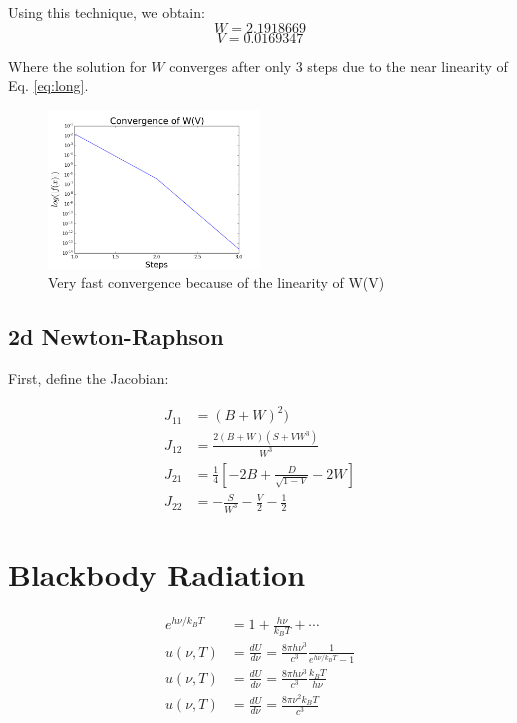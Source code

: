 \documentclass[12pt]{article}
\begin{document}
  Using this technique, we obtain:
  $$W=2.1918669$$
  $$V = 0.0169347 $$

  Where the solution for $W$ converges after only 3 steps due to the near
  linearity of Eq. \ref{eq:long}.

  \begin{figure}[h]
    \centering
    \includegraphics[width=0.5\textwidth]{Problem8a.png}
    \caption{Very fast convergence because of the linearity of W(V)}
  \end{figure}

  \clearpage

  \subsection*{2d Newton-Raphson}

  First, define the Jacobian:

  \begin{align}
    J_{11} &= (B+W)^2)  \nonumber \\
    J_{12} &= \frac{2(B+W)(S + VW^3)}{W^3}  \nonumber \\
    J_{21} &= \frac{1}{4}\left[-2B+\frac{D}{\sqrt{1-V}}-2W\right]  \nonumber \\
    J_{22} &= -\frac{S}{W^3}-\frac{V}{2}-\frac{1}{2} \nonumber
  \end{align}

  

  \clearpage

  \section{Blackbody Radiation}
  
  \begin{align} 
    e^{h\nu / k_B T} &= 1 + \frac{h \nu}{k_B T} + \cdots \nonumber \\
    u(\nu, T) &= \frac{dU}{d\nu} =
    \frac{8\pi h \nu^3}{c^3}\frac{1}{e^{h\nu/k_B T}-1} \nonumber \\
    u(\nu, T) &= \frac{dU}{d\nu}  =
      \frac{8\pi h \nu^3}{c^3}\frac{k_B T}{h \nu} \nonumber \\
    \label{eq:nu}
    u(\nu, T) &= \frac{dU}{d\nu}  =
      \frac{8\pi \nu^2 k_B T}{c^3 }
  \end{align}
\end{document}
